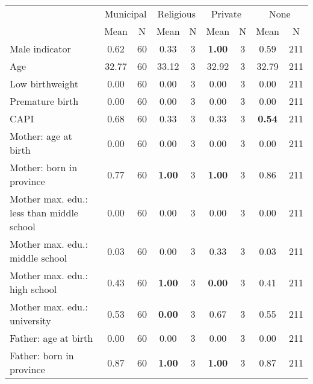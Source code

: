 \begin{tabular}{l c c c c c c c c}
\toprule
& \multicolumn{2}{c}{Municipal} & \multicolumn{2}{c}{Religious} & \multicolumn{2}{c}{Private} & \multicolumn{2}{c}{None} \\
& \scriptsize Mean & \scriptsize N & \scriptsize Mean & \scriptsize N & \scriptsize Mean & \scriptsize N & \scriptsize Mean & \scriptsize N \\
\midrule
Male indicator &      0.62 &        60 &      0.33 &         3 & \textbf{     1.00} &         3 &      0.59 &       211 \\
Age &     32.77 &        60 &     33.12 &         3 &     32.92 &         3 &     32.79 &       211 \\
Low birthweight &      0.00 &        60 &      0.00 &         3 &      0.00 &         3 &      0.00 &       211 \\
Premature birth &      0.00 &        60 &      0.00 &         3 &      0.00 &         3 &      0.00 &       211 \\
CAPI &      0.68 &        60 &      0.33 &         3 &      0.33 &         3 & \textbf{     0.54} &       211 \\
Mother: age at birth &      0.00 &        60 &      0.00 &         3 &      0.00 &         3 &      0.00 &       211 \\
Mother: born in province &      0.77 &        60 & \textbf{     1.00} &         3 & \textbf{     1.00} &         3 &      0.86 &       211 \\
Mother max. edu.: less than middle school &      0.00 &        60 &      0.00 &         3 &      0.00 &         3 &      0.00 &       211 \\
Mother max. edu.: middle school &      0.03 &        60 &      0.00 &         3 &      0.33 &         3 &      0.03 &       211 \\
Mother max. edu.: high school &      0.43 &        60 & \textbf{     1.00} &         3 & \textbf{     0.00} &         3 &      0.41 &       211 \\
Mother max. edu.: university &      0.53 &        60 & \textbf{     0.00} &         3 &      0.67 &         3 &      0.55 &       211 \\
Father: age at birth &      0.00 &        60 &      0.00 &         3 &      0.00 &         3 &      0.00 &       211 \\
Father: born in province &      0.87 &        60 & \textbf{     1.00} &         3 & \textbf{     1.00} &         3 &      0.87 &       211 \\

\end{tabular}
